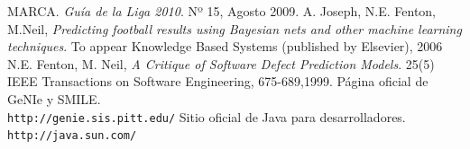 \documentclass[a4paper,12pt]{article}
\begin{document}
\begin{thebibliography}{10}
 MARCA. \emph{Guía de la Liga 2010}. Nº 15, Agosto 2009.
 A. Joseph, N.E. Fenton, M.Neil, \emph{Predicting football results using Bayesian nets and other machine learning techniques}. To appear Knowledge Based Systems (published by Elsevier), 2006
 N.E. Fenton, M. Neil, \emph{A Critique of Software Defect Prediction Models}. 25(5) IEEE Transactions on Software Engineering, 675-689,1999.
 Página oficial de GeNIe y SMILE.\\
  \texttt{http://genie.sis.pitt.edu/}
 Sitio oficial de Java para desarrolladores.\\
\texttt{http://java.sun.com/}
\end{thebibliography}
\end{document}
